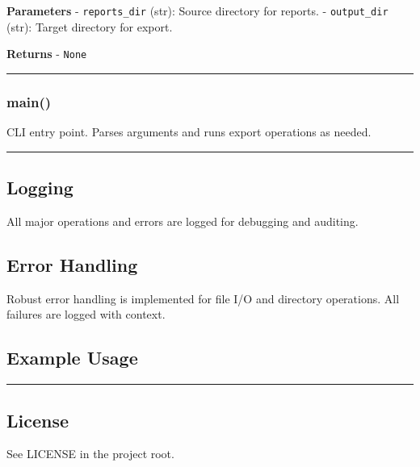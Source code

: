 \textbf{Parameters} - \texttt{reports\_dir} (str): Source directory for
reports. - \texttt{output\_dir} (str): Target directory for export.

\textbf{Returns} - \texttt{None}

\begin{center}\rule{0.5\linewidth}{0.5pt}\end{center}

\subsubsection{main()}\label{main}

CLI entry point. Parses arguments and runs export operations as needed.

\begin{center}\rule{0.5\linewidth}{0.5pt}\end{center}

\subsection{Logging}\label{logging}

All major operations and errors are logged for debugging and auditing.

\subsection{Error Handling}\label{error-handling}

Robust error handling is implemented for file I/O and directory
operations. All failures are logged with context.

\subsection{Example Usage}\label{example-usage}

\begin{Shaded}
\begin{Highlighting}[]
\OperatorTok{=}\OperatorTok{=}\OperatorTok{=}\NormalTok{)}
\end{Highlighting}
\end{Shaded}

\begin{center}\rule{0.5\linewidth}{0.5pt}\end{center}

\subsection{License}\label{license}

See LICENSE in the project root.
